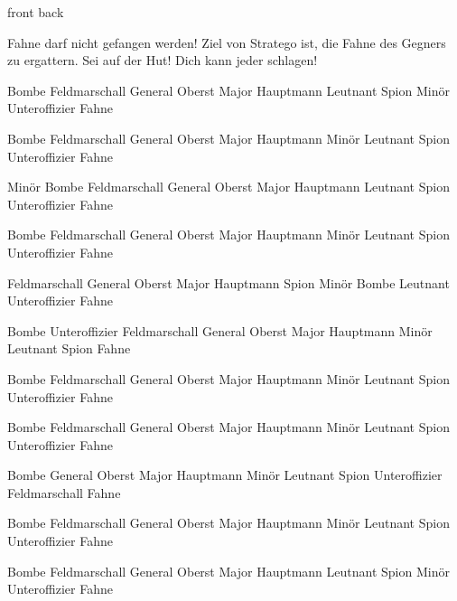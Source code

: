 \documentclass[a4paper,stratego,grid]{flashcards}
\begin{document}
\begin{flashcard}[foo]{front}%
back
\end{flashcard}

\*Fahne
darf nicht gefangen
werden!
Ziel von Stratego ist,
die Fahne des
Gegners zu
ergattern.
Sei auf der Hut!
Dich kann jeder
schlagen!



Bombe
Feldmarschall
General
Oberst
Major
Hauptmann
Leutnant
\*Spion
Minör
Unteroffizier
Fahne


Bombe
Feldmarschall
General
Oberst
Major
Hauptmann
Minör
\*Leutnant
Spion
Unteroffizier
Fahne

Minör
\*Bombe
Feldmarschall
General
Oberst
Major
Hauptmann
Leutnant
Spion
Unteroffizier
Fahne



Bombe
Feldmarschall
\*General
Oberst
Major
Hauptmann
Minör
Leutnant
Spion
Unteroffizier
Fahne



Feldmarschall
General
Oberst
Major
Hauptmann
Spion
\*Minör
Bombe
Leutnant
Unteroffizier
Fahne


Bombe
Unteroffizier
\*Feldmarschall
General
Oberst
Major
Hauptmann
Minör
Leutnant
Spion
Fahne


Bombe
Feldmarschall
General
\*Oberst
Major
Hauptmann
Minör
Leutnant
Spion
Unteroffizier
Fahne


Bombe
Feldmarschall
General
Oberst
Major
\*Hauptmann
Minör
Leutnant
Spion
Unteroffizier
Fahne

Bombe
General
Oberst
Major
Hauptmann
Minör
Leutnant
Spion
\*Unteroffizier
Feldmarschall
Fahne

Bombe
Feldmarschall
General
Oberst
\*Major
Hauptmann
Minör
Leutnant
Spion
Unteroffizier
Fahne

Bombe
Feldmarschall
General
Oberst
Major
Hauptmann
Leutnant
\*Spion
Minör
Unteroffizier
Fahne
\end{document}
